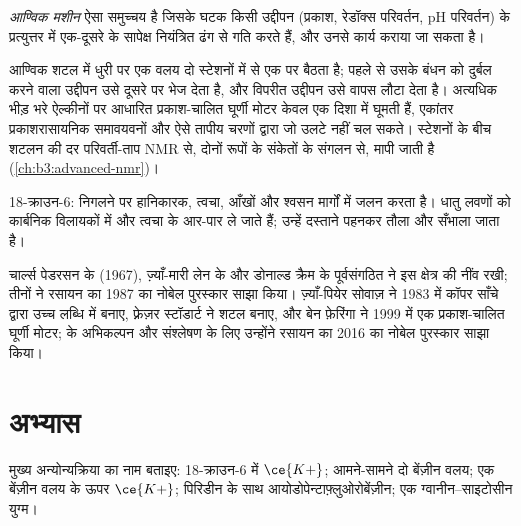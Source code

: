 \begin{definition}[आण्विक मशीनें]\label{def:b3:supramolecular:machine}
\emph{आण्विक मशीन} ऐसा समुच्चय है जिसके
घटक किसी उद्दीपन (प्रकाश, रेडॉक्स परिवर्तन, pH परिवर्तन) के प्रत्युत्तर में
एक-दूसरे के सापेक्ष नियंत्रित ढंग से गति करते हैं, और उनसे कार्य कराया जा सकता है।
\end{definition}

आण्विक शटल में  धुरी पर एक वलय दो स्टेशनों में से एक पर बैठता है; पहले से उसके
बंधन को दुर्बल करने वाला उद्दीपन उसे दूसरे पर भेज देता है, और
विपरीत उद्दीपन उसे वापस लौटा देता है। अत्यधिक भीड़ भरे ऐल्कीनों पर आधारित
प्रकाश-चालित घूर्णी मोटर केवल एक दिशा में घूमती हैं, एकांतर प्रकाशरासायनिक
समावयवनों और ऐसे तापीय चरणों द्वारा जो उलटे नहीं चल सकते। स्टेशनों के बीच
शटलन की दर परिवर्ती-ताप NMR से, दोनों रूपों के संकेतों के
संगलन से, मापी जाती है (\cref{ch:b3:advanced-nmr})।

\begin{safety}{}
18-क्राउन-6: निगलने पर हानिकारक, त्वचा, आँखों और श्वसन मार्गों में जलन करता है।
 धातु लवणों को कार्बनिक विलायकों में और त्वचा के आर-पार ले जाते हैं; उन्हें
दस्ताने पहनकर तौला और सँभाला जाता है।
\end{safety}

\begin{history}[अधिआण्विक रसायन और उसकी मशीनें]
चार्ल्स पेडरसन के  (1967), ज़्याँ-मारी लेन के  और डोनाल्ड
क्रैम के पूर्वसंगठित  ने इस क्षेत्र की नींव रखी; तीनों ने रसायन का 1987 का नोबेल
पुरस्कार साझा किया। ज़्याँ-पियेर सोवाज़ ने 1983 में कॉपर
साँचे द्वारा उच्च लब्धि में  बनाए, फ़्रेज़र स्टॉडार्ट ने  शटल बनाए, और बेन
फ़ेरिंगा ने 1999 में एक प्रकाश-चालित घूर्णी मोटर;  के अभिकल्पन और संश्लेषण के लिए उन्होंने
रसायन का 2016 का नोबेल पुरस्कार साझा किया।
\end{history}

\section{अभ्यास}

\begin{exercise}[$\star$]\label{exo:b3:supramolecular:1}
मुख्य अन्योन्यक्रिया का नाम बताइए: 18-क्राउन-6 में $\ce{K+}$; आमने-सामने दो बेंज़ीन वलय;
एक बेंज़ीन वलय के ऊपर $\ce{K+}$; पिरिडीन के साथ आयोडोपेन्टाफ़्लुओरोबेंज़ीन; एक ग्वानीन--साइटोसीन
युग्म।
\end{exercise}

